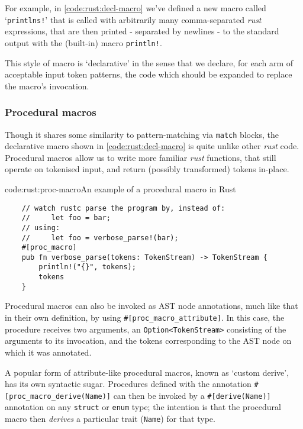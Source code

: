 For example, in \cref{code:rust:decl-macro} we've defined a new macro called `\texttt{printlns!}' that is called with arbitrarily many comma-separated \emph{rust} expressions, that are then printed - separated by newlines - to the standard output with the (built-in) macro \texttt{println!}. \cite{rust_rfc1584}

This style of macro is `declarative' in the sense that we declare, for each arm of acceptable input token patterns, the code which should be expanded to replace the macro's invocation.

\subsubsection{Procedural macros} \label{bg:rust:proc-macros}

Though it shares some similarity to pattern-matching via \texttt{match} blocks, the declarative macro shown in \cref{code:rust:decl-macro} is quite unlike other \emph{rust} code. Procedural macros allow us to write more familiar \emph{rust} functions, that still operate on tokenised input, and return (possibly transformed) tokens in-place.

\begin{codelisting}{code:rust:proc-macro}{An example of a procedural macro in Rust}
\begin{spacing}{\codespacing}
\begin{verbatim}
	// watch rustc parse the program by, instead of:
	//     let foo = bar;
	// using:
	//     let foo = verbose_parse!(bar);
	#[proc_macro]
	pub fn verbose_parse(tokens: TokenStream) -> TokenStream {
	    println!("{}", tokens);
	    tokens
	}
\end{verbatim}
\end{spacing}
\end{codelisting}

Procedural macros can also be invoked as AST node annotations, much like that in their own definition, by using \texttt{#[proc_macro_attribute]}. In this case, the procedure receives two arguments, an \texttt{Option<TokenStream>} consisting of the arguments to its invocation, and the tokens corresponding to the AST node on which it was annotated. \cite{rust_rfc1566}

A popular form of attribute-like procedural macros, known as `custom derive', has its own syntactic sugar. Procedures defined with the annotation \texttt{#[proc_macro_derive(Name)]} can then be invoked by a \texttt{#[derive(Name)]} annotation on any \texttt{struct} or \texttt{enum} type; the intention is that the procedural macro then \emph{derives} a particular trait (\texttt{Name}) for that type.

